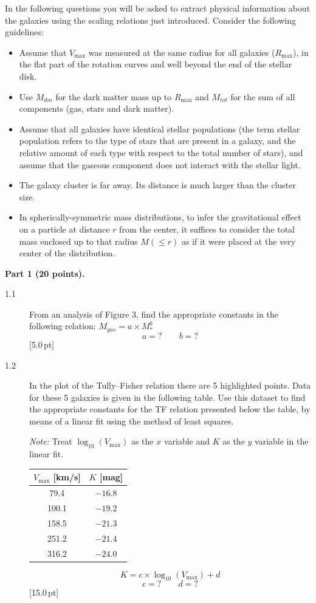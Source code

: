 In the following questions you will be asked to extract physical information
about the galaxies using the scaling relations just introduced. Consider the
following guidelines:
\begin{itemize}
\item Assume that $V_{\max}$ was measured at the same radius for all galaxies
  ($R_{\max}$), in the flat part of the rotation curves and well beyond the
  end of the stellar disk.
\item Use $M_{dm}$ for the dark matter mass up to $R_{\max}$ and $M_{tot}$
  for the sum of all components (gas, stars and dark matter).
\item Assume that all galaxies have identical stellar populations (the term
  stellar population refers to the type of stars that are present in a
  galaxy, and the relative amount of each type with respect to the total
  number of stars), and assume that the gaseous component does not interact
  with the stellar light.
\item The galaxy cluster is far away. Its distance is much larger than the
  cluster size.
\item In spherically-symmetric mass distributions, to infer the gravitational
  effect on a particle at distance $r$ from the center, it suffices to
  consider the total mass enclosed up to that radius $M(\leq r)$ as if it
  were placed at the very center of the distribution.
\end{itemize}

\medskip
\textbf{Part 1 (20 points).}

\begin{description}
\item[1.1] From an analysis of Figure 3, find the appropriate constants in the
  following relation: $M_{gas} = a \times M_*^b$
  \[ a = ?\qquad b = ? \]
  \hfill[5.0\,pt]
\item[1.2] In the plot of the Tully--Fisher relation there are 5 highlighted
  points. Data for these 5 galaxies is given in the following table. Use this
  dataset to find the appropriate constants for the TF relation presented
  below the table, by means of a linear fit using the method of least
  squares.

  \emph{Note:} Treat $\log_{10}(V_{\max})$ as the $x$ variable and $K$ as the
  $y$ variable in the linear fit.

  \begin{center}
  \begin{tabular}{cc}
  $V_{\max}$ [km/s] & $K$ [mag] \\
  \hline
   79.4 & $-16.8$ \\
  100.1 & $-19.2$ \\
  158.5 & $-21.3$ \\
  251.2 & $-21.4$ \\
  316.2 & $-24.0$ \\
  \end{tabular}
  \end{center}

  \[ K = c \times \log_{10}(V_{\max}) + d \]
  \[ c = ?\qquad d = ? \]
  \hfill[15.0\,pt]
\end{description}

